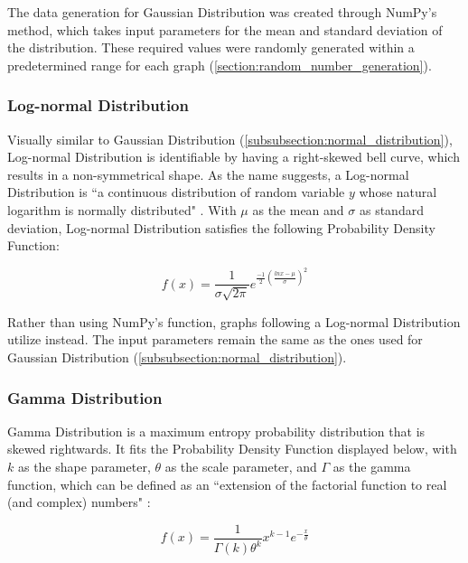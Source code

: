 \hfill

The data generation for Gaussian Distribution was created through NumPy's  method, which takes input parameters for the mean and standard deviation of the distribution. These required values were randomly generated within a predetermined range for each graph (\autoref{section:random_number_generation}).


\subsubsection{Log-normal Distribution}
Visually similar to Gaussian Distribution (\autoref{subsubsection:normal_distribution}), Log-normal Distribution is identifiable by having a right-skewed bell curve, which results in a non-symmetrical shape. As the name suggests, a Log-normal Distribution is ``a continuous distribution of random variable \(y\) whose natural logarithm is normally distributed" \cite{KISSELL2017103}. With \(\mu\) as the mean and \(\sigma\) as standard deviation, Log-normal Distribution satisfies the following Probability Density Function: 

\begin{displaymath}
f(x) = \frac{1}{\sigma\sqrt{2\pi}}e^{\frac{-1}{2}(\frac{lnx-\mu}{\sigma})^2}
\end{displaymath}

\hfill

Rather than using NumPy's  function, graphs following a Log-normal Distribution utilize  instead. The input parameters remain the same as the ones used for Gaussian Distribution (\autoref{subsubsection:normal_distribution}).

\subsubsection{Gamma Distribution}
Gamma Distribution is a maximum entropy probability distribution that is skewed rightwards. It fits the Probability Density Function displayed below, with \(k\) as the shape parameter, \(\theta\) as the scale parameter, and \(\Gamma\) as the gamma function, which can be defined as an ``extension of the factorial function to real (and complex) numbers" \cite{glen_2014}:

\begin{displaymath}
f(x) = \frac{1}{\Gamma(k)\theta^k}x^{k-1}e^{-\frac{x}{\theta}}
\end{displaymath}

